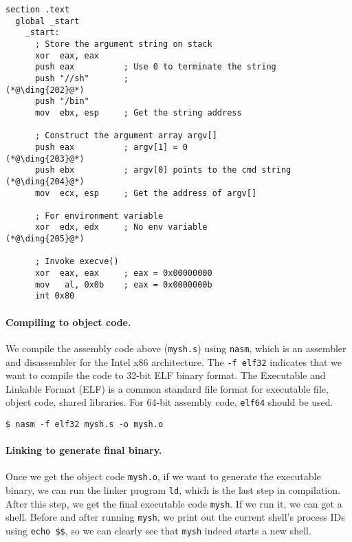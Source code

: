 \begin{lstlisting}[caption={A basic shellcode example \texttt{mysh.s}}]
section .text
  global _start
    _start:
      ; Store the argument string on stack
      xor  eax, eax
      push eax          ; Use 0 to terminate the string  
      push "//sh"       ;                                  (*@\ding{202}@*)
      push "/bin"
      mov  ebx, esp     ; Get the string address

      ; Construct the argument array argv[]
      push eax          ; argv[1] = 0                      (*@\ding{203}@*)
      push ebx          ; argv[0] points to the cmd string (*@\ding{204}@*)
      mov  ecx, esp     ; Get the address of argv[]

      ; For environment variable 
      xor  edx, edx     ; No env variable                  (*@\ding{205}@*)

      ; Invoke execve()
      xor  eax, eax     ; eax = 0x00000000
      mov   al, 0x0b    ; eax = 0x0000000b 
      int 0x80
\end{lstlisting}


\paragraph{Compiling to object code.}
We compile the assembly code above (\texttt{mysh.s}) using \texttt{nasm}, which 
is an assembler and disassembler for the Intel x86 architecture.
The \texttt{-f elf32} indicates that we want to compile the code
to 32-bit ELF binary format. The Executable and Linkable Format (ELF) 
is a common standard file format for executable file, object code, shared libraries. 
For 64-bit assembly code, \texttt{elf64} should be used. 

\begin{lstlisting}
$ nasm -f elf32 mysh.s -o mysh.o
\end{lstlisting}


\paragraph{Linking to generate final binary.}
Once we get the object code \texttt{mysh.o}, if we want to generate the 
executable binary, we can run the linker program \texttt{ld}, which
is the last step in compilation. After this step, we get the final
executable code \texttt{mysh}. If we run it, we can get a shell. 
Before and after running \texttt{mysh},  
we print out the current shell's process IDs using \texttt{echo \$\$},
so we can clearly see that \texttt{mysh} indeed starts a new shell. 

